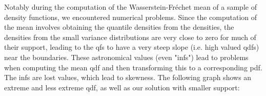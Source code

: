 Notably during the computation of the Wasserstein-Fréchet mean of a sample of density
functions, we encountered numerical problems. Since the computation of the mean involves
obtaining the quantile densities from the densities, the densities from the small
variance distributions are very close to zero for much of their support, leading to the
qfs to have a very steep slope (i.e. high valued qdfs) near the boundaries. These
astronomical values (even "infs") lead to problems when computing the mean qdf and then
transforming this to a corresponding pdf. The infs are lost values, which lead to skewness.
The following graph shows an extreme and less extreme qdf, as well as our solution with
smaller support:
